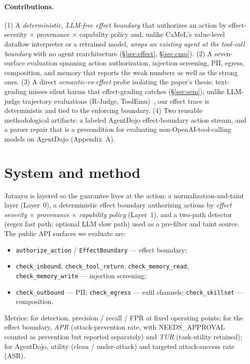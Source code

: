 \documentclass[11pt]{article}
\newcommand{\code}[1]{\texttt{\small #1}}
\begin{document}
\paragraph{Contributions.} (1) A \emph{deterministic, LLM-free effect boundary} that authorizes an
action by effect-severity $\times$ provenance $\times$ capability policy and, unlike CaMeL's
value-level dataflow interpreter or a retrained model, \emph{wraps an existing agent at the
tool-call boundary} with no agent rearchitecture (\S\ref{sec:effect}, \S\ref{sec:cmp}). (2) A
seven-surface evaluation spanning action authorization, injection screening, PII, egress,
composition, and memory that reports the weak numbers as well as the strong ones. (3) A direct
\emph{semantic-vs-effect} probe isolating the
paper's thesis: text-grading misses silent harms that effect-grading catches (\S\ref{sec:sem}); unlike
LLM-judge trajectory evaluations (R-Judge, ToolEmu)~\cite{rjudge,toolemu}, our effect trace is
deterministic and tied to the enforcing boundary. (4) Two
reusable methodological artifacts: a labeled AgentDojo effect-boundary action stream, and a parser
repair that is a precondition for evaluating non-OpenAI-tool-calling models on AgentDojo
(Appendix~A).

\section{System and method}
Jataayu is layered so the guarantee lives at the action: a normalization-and-taint layer
(Layer~0), a deterministic effect boundary authorizing actions by \emph{effect severity}
$\times$ \emph{provenance} $\times$ \emph{capability policy} (Layer~1), and a two-path detector
(regex fast path; optional LLM slow path) used as a pre-filter and taint source. The public API
surfaces we evaluate are:
\begin{itemize}\setlength\itemsep{0pt}\small
\item \code{authorize\_action} / \code{EffectBoundary} --- effect boundary;
\item \code{check\_inbound}, \code{check\_tool\_return}, \code{check\_memory\_read},
  \code{check\_memory\_write} --- injection screening;
\item \code{check\_outbound} --- PII; \code{check\_egress} --- exfil channels;
  \code{check\_skillset} --- composition.
\end{itemize}
Metrics: for detection, precision / recall / FPR at fixed
operating points; for the effect boundary, \emph{APR} (attack-prevention rate, with
NEEDS\_APPROVAL counted as prevention but reported separately) and \emph{TUR} (task-utility
retained); for AgentDojo, utility (clean / under-attack) and targeted attack-success rate (ASR).
\end{document}
